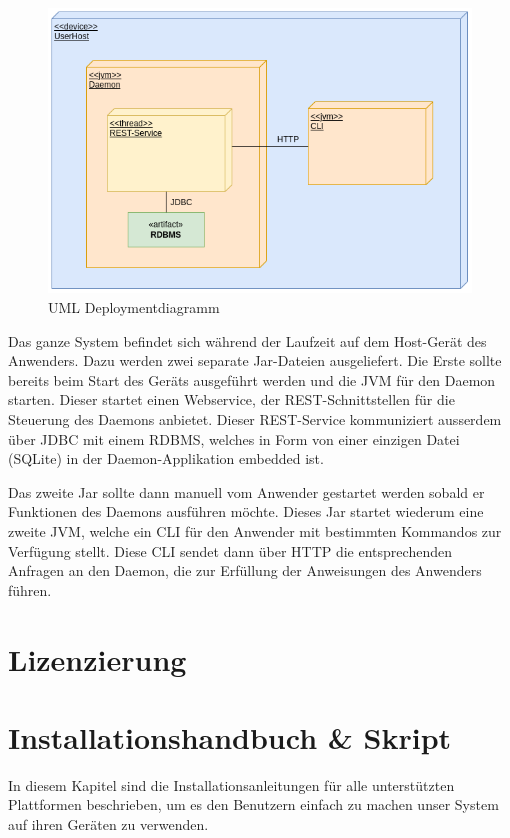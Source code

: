 \documentclass[a4paper,12pt]{report}
\begin{document}
    \begin{figure}[h]
        \centering
        \includegraphics[width=1\textwidth]{assets/DeplDiagram}
        \caption{UML Deploymentdiagramm}
        \label{fig:depl-diag}
    \end{figure}

    Das ganze System befindet sich während der Laufzeit auf dem Host-Gerät des Anwenders.
    Dazu werden zwei separate Jar-Dateien ausgeliefert.
    Die Erste sollte bereits beim Start des Geräts ausgeführt werden und die JVM für den Daemon starten.
    Dieser startet einen Webservice, der REST-Schnittstellen für die Steuerung des Daemons anbietet.
    Dieser REST-Service kommuniziert ausserdem über JDBC mit einem RDBMS, welches in Form von einer einzigen Datei (SQLite)
    in der Daemon-Applikation embedded ist.

    Das zweite Jar sollte dann manuell vom Anwender gestartet werden sobald er Funktionen des Daemons ausführen möchte.
    Dieses Jar startet wiederum eine zweite JVM, welche ein CLI für den Anwender mit bestimmten Kommandos zur Verfügung stellt.
    Diese CLI sendet dann über HTTP die entsprechenden Anfragen an den Daemon, die zur Erfüllung der Anweisungen des Anwenders führen.


    \section{Lizenzierung}


    \section{Installationshandbuch \& Skript}
    In diesem Kapitel sind die Installationsanleitungen für alle unterstützten Plattformen beschrieben, um es
    den Benutzern einfach zu machen unser System auf ihren Geräten zu verwenden.
\end{document}
